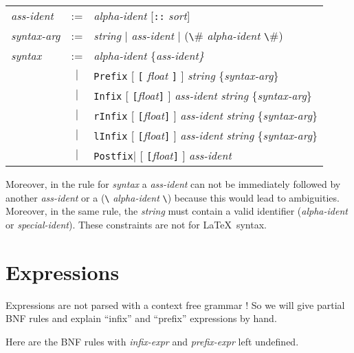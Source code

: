 \begin{center}
\begin{tabular}{lcl}
{\it ass-ident} &:=& {\it alpha-ident} [\verb#::# {\it sort}] \\
{\it syntax-arg} &:=& {\it string} $|$ {\it ass-ident} $|$ (\verb#\# {\it
  alpha-ident} \verb#\#) \\
{\it syntax} &:=&
   {\it alpha-ident} \{\it ass-ident\} \\
  &$|$&
  \verb#Prefix# [ \verb#[# {\it float} \verb#]# ]
    {\it string} \{{\it syntax-arg}\} \\
  &$|$&
  \verb#Infix# [ \verb#[#{\it float}\verb#]# ]
    {\it ass-ident} {\it string} \{{\it syntax-arg}\} \\
  &$|$&
  \verb#rInfix# [ \verb#[#{\it float}\verb#]# ]
    {\it ass-ident} {\it string} \{{\it syntax-arg}\} \\
  &$|$&
  \verb#lInfix# [ \verb#[#{\it float}\verb#]# ]
    {\it ass-ident} {\it string} \{{\it syntax-arg}\} \\
  &$|$&
  \verb#Postfix#$|$ [ \verb#[#{\it float}\verb#]# ]
    {\it ass-ident}
\end{tabular}
\end{center}

Moreover, in the rule for {\it syntax} a {\it ass-ident} can not be immediately
followed by another {\it ass-ident} or a (\verb#\# {\it alpha-ident} \verb#\#)
because this would lead to ambiguities. Moreover, in the same rule, the {\it
string} must contain a valid identifier ({\it alpha-ident} or {\it
special-ident}). These constraints are not for \LaTeX\  syntax.

\section{Expressions}

Expressions are not parsed with a context free grammar ! So we will
give partial BNF rules and explain ``infix'' and ``prefix''
expressions by hand.

Here are the BNF rules with {\it infix-expr} and {\it prefix-expr}
left undefined.

